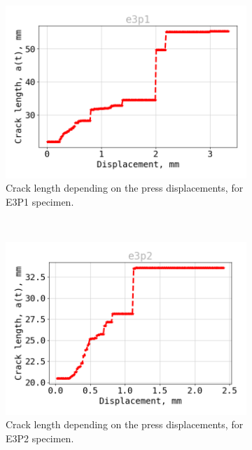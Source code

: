 \begin{figure}[H]
\centering
\begin{subfigure}{0.48\linewidth}
	\centering
	\includegraphics[scale=0.3]{Figures/e3p1_a}
	\decoRule
	\caption[Crack length E3P1]{Crack length depending on the press displacements, for E3P1 specimen.}
	\label{fig:E3P1_a}
\end{subfigure}
\hfill\\
\begin{subfigure}{0.48\linewidth}
	\centering
	\includegraphics[scale=0.3]{Figures/e3p2_a}
	\decoRule
	\caption[Crack length E3P2]{Crack length depending on the press displacements, for E3P2 specimen.}
	\label{fig:E3P2_a}
\end{subfigure}
\hfill\\
\begin{subfigure}{0.48\linewidth}

\end{subfigure}
\end{figure}
